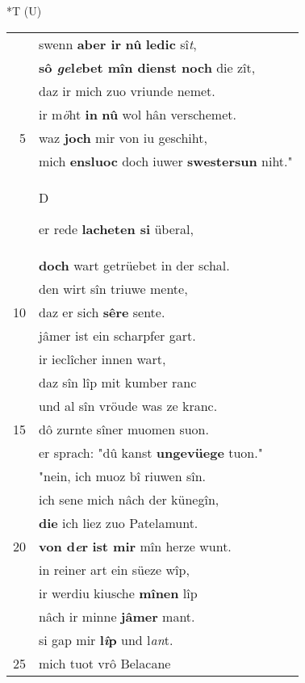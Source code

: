 \documentclass[8pt,a4paper,notitlepage]{article}
\begin{document}
\begin{table}[ht]
\begin{minipage}[t]{0.5\linewidth}
\end{minipage}
\hspace{0.5cm}
\begin{minipage}[t]{0.5\linewidth}
\small
\begin{center}*T (U)
\end{center}
\begin{tabular}{rl}
 & swenn \textbf{aber ir} \textbf{nû} \textbf{ledic} sî\textit{t},\\ 
 & \textbf{sô \textit{ge}l\textit{e}bet mîn dienst noch} die zît,\\ 
 & daz ir mich zuo vriunde nemet.\\ 
 & ir m\textit{ö}ht \textbf{in} \textbf{nû} wol hân verschemet.\\ 
5 & waz \textbf{joch} mir von iu geschiht,\\ 
 & mich \textbf{ensluoc} doch iuwer \textbf{swestersun} niht."\\ 
 & \begin{large}D\end{large}er rede \textbf{lacheten si} überal,\\ 
 & \textbf{doch} wart getrüebet in der schal.\\ 
 & den wirt sîn triuwe mente,\\ 
10 & daz er sich \textbf{sêre} sente.\\ 
 & jâmer ist ein scharpfer gart.\\ 
 & ir ieclîcher innen wart,\\ 
 & daz sîn lîp mit kumber ranc\\ 
 & und al sîn vröude was ze kranc.\\ 
15 & dô zurnte sîner muomen suon.\\ 
 & er sprach: "dû kanst \textbf{ungevüege} tuon."\\ 
 & "nein, ich muoz bî riuwen sîn.\\ 
 & ich sene mich nâch der künegîn,\\ 
 & \textbf{die} ich liez zuo Patelamunt.\\ 
20 & \textbf{von d\textit{e}r} \textbf{ist mir} mîn herze wunt.\\ 
 & in reiner art ein süeze wîp,\\ 
 & ir werdiu kiusche \textbf{mînen} lîp\\ 
 & nâch ir minne \textbf{jâmer} mant.\\ 
 & si gap mir \textbf{l\textit{î}p} und l\textit{an}t.\\ 
25 & mich tuot vrô Belacane\\ 

\end{tabular}
\end{minipage}
\end{table}
\end{document}
